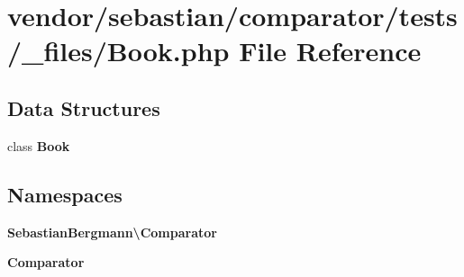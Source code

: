 \section{vendor/sebastian/comparator/tests/\+\_\+files/\+Book.php File Reference}
\label{sebastian_2comparator_2tests_2__files_2_book_8php}
\subsection*{Data Structures}
\begin{DoxyCompactItemize}
\item 
class {\bf Book}
\end{DoxyCompactItemize}
\subsection*{Namespaces}
\begin{DoxyCompactItemize}
\item 
 {\bf Sebastian\+Bergmann\textbackslash{}\+Comparator}
\item 
 {\bf Comparator}
\end{DoxyCompactItemize}

